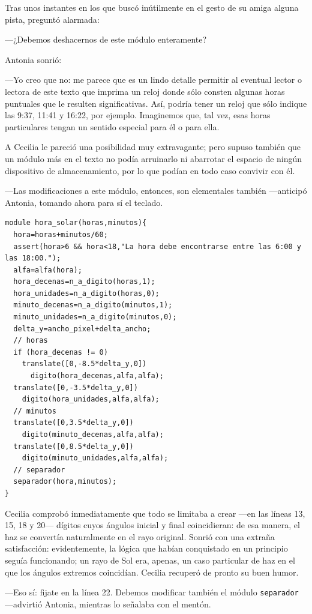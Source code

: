 Tras unos instantes en los que buscó inútilmente en el gesto de su
amiga alguna pista, preguntó alarmada:

---¿Debemos deshacernos de este módulo enteramente?

Antonia sonrió:

---Yo creo que no: me parece que es un lindo detalle permitir al
eventual lector o lectora de este texto que imprima un reloj donde
sólo consten algunas horas puntuales que le resulten
significativas. Así, podría tener un reloj que sólo indique las 9:37,
11:41 y 16:22, por ejemplo. Imaginemos que, tal vez, esas horas
particulares tengan un sentido especial para él o para ella.

A Cecilia le pareció una posibilidad muy extravagante; pero supuso
también que un módulo más en el texto no podía arruinarlo ni abarrotar
el espacio de ningún dispositivo de almacenamiento, por lo que podían
en todo caso convivir con él.

---Las modificaciones a este módulo, entonces, son elementales también
---anticipó Antonia, tomando ahora para sí el teclado.

\begin{lstlisting}
module hora_solar(horas,minutos){
  hora=horas+minutos/60;
  assert(hora>6 && hora<18,"La hora debe encontrarse entre las 6:00 y las 18:00.");
  alfa=alfa(hora);
  hora_decenas=n_a_digito(horas,1);
  hora_unidades=n_a_digito(horas,0);
  minuto_decenas=n_a_digito(minutos,1);
  minuto_unidades=n_a_digito(minutos,0);                    
  delta_y=ancho_pixel+delta_ancho;
  // horas    
  if (hora_decenas != 0)
    translate([0,-8.5*delta_y,0])
      digito(hora_decenas,alfa,alfa);
  translate([0,-3.5*delta_y,0])
    digito(hora_unidades,alfa,alfa);  
  // minutos
  translate([0,3.5*delta_y,0])
    digito(minuto_decenas,alfa,alfa);
  translate([0,8.5*delta_y,0])
    digito(minuto_unidades,alfa,alfa);  
  // separador
  separador(hora,minutos);
}
\end{lstlisting}

Cecilia comprobó inmediatamente que todo se limitaba a crear ---en las
líneas 13, 15, 18 y 20--- dígitos cuyos ángulos inicial y final
coincidieran: de esa manera, el haz se convertía naturalmente en el
rayo original. Sonrió con una extraña satisfacción: evidentemente, la
lógica que habían conquistado en un principio seguía funcionando; un
rayo de Sol era, apenas, un caso particular de haz en el que los
ángulos extremos coincidían. Cecilia recuperó de pronto su buen humor.

---Eso sí: fijate en la línea 22. Debemos modificar también el módulo
\lstinline!separador! ---advirtió Antonia, mientras lo señalaba con el
mentón.

